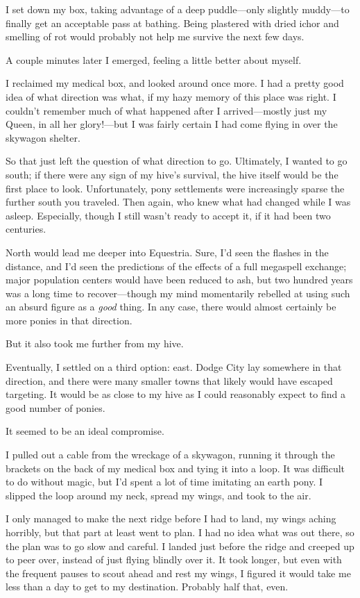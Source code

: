 I set down my box, taking advantage of a deep puddle—only slightly muddy—to finally get an acceptable pass at bathing. Being plastered with dried ichor and smelling of rot would probably not help me survive the next few days.

A couple minutes later I emerged, feeling a little better about myself.

I reclaimed my medical box, and looked around once more. I had a pretty good idea of what direction was what, if my hazy memory of this place was right. I couldn’t remember much of what happened after I arrived—mostly just my Queen, in all her glory!—but I was fairly certain I had come flying in over the skywagon shelter.

So that just left the question of what direction to go. Ultimately, I wanted to go south; if there were any sign of my hive’s survival, the hive itself would be the first place to look. Unfortunately, pony settlements were increasingly sparse the further south you traveled. Then again, who knew what had changed while I was asleep. Especially, though I still wasn’t ready to accept it, if it had been two centuries.

North would lead me deeper into Equestria. Sure, I’d seen the flashes in the distance, and I’d seen the predictions of the effects of a full megaspell exchange; major population centers would have been reduced to ash, but two hundred years was a long time to recover—though my mind momentarily rebelled at using such an absurd figure as a \textit{good} thing. In any case, there would almost certainly be more ponies in that direction.

But it also took me further from my hive.

Eventually, I settled on a third option: east. Dodge City lay somewhere in that direction, and there were many smaller towns that likely would have escaped targeting. It would be as close to my hive as I could reasonably expect to find a good number of ponies.

It seemed to be an ideal compromise.

I pulled out a cable from the wreckage of a skywagon, running it through the brackets on the back of my medical box and tying it into a loop. It was difficult to do without magic, but I’d spent a lot of time imitating an earth pony. I slipped the loop around my neck, spread my wings, and took to the air.

I only managed to make the next ridge before I had to land, my wings aching horribly, but that part at least went to plan. I had no idea what was out there, so the plan was to go slow and careful. I landed just before the ridge and creeped up to peer over, instead of just flying blindly over it. It took longer, but even with the frequent pauses to scout ahead and rest my wings, I figured it would take me less than a day to get to my destination. Probably half that, even.

